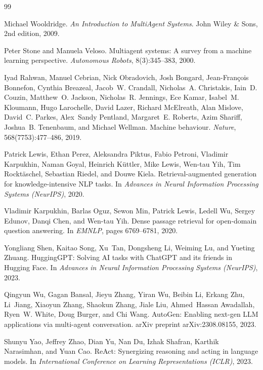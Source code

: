 \documentclass{article}
\begin{document}
\begin{thebibliography}{99}

Michael Wooldridge.
\newblock \emph{An Introduction to MultiAgent Systems}.
\newblock John Wiley \& Sons, 2nd edition, 2009.

Peter Stone and Manuela Veloso.
\newblock Multiagent systems: A survey from a machine learning perspective.
\newblock \emph{Autonomous Robots}, 8(3):345--383, 2000.

Iyad Rahwan, Manuel Cebrian, Nick Obradovich, Josh Bongard, Jean{-}Fran{\c{c}}ois Bonnefon, Cynthia Breazeal, Jacob~W. Crandall, Nicholas~A. Christakis, Iain~D. Couzin, Matthew~O. Jackson, Nicholas~R. Jennings, Ece Kamar, Isabel~M. Kloumann, Hugo Larochelle, David Lazer, Richard McElreath, Alan Mislove, David~C. Parkes, Alex~Sandy Pentland, Margaret~E. Roberts, Azim Shariff, Joshua~B. Tenenbaum, and Michael Wellman.
\newblock Machine behaviour.
\newblock \emph{Nature}, 568(7753):477--486, 2019.

Patrick Lewis, Ethan Perez, Aleksandra Piktus, Fabio Petroni, Vladimir Karpukhin, Naman Goyal, Heinrich K{\"u}ttler, Mike Lewis, Wen{-}tau Yih, Tim Rockt{\"a}schel, Sebastian Riedel, and Douwe Kiela.
\newblock Retrieval{-}augmented generation for knowledge{-}intensive NLP tasks.
\newblock In \emph{Advances in Neural Information Processing Systems (NeurIPS)}, 2020.

Vladimir Karpukhin, Barlas Oguz, Sewon Min, Patrick Lewis, Ledell Wu, Sergey Edunov, Danqi Chen, and Wen{-}tau Yih.
\newblock Dense passage retrieval for open{-}domain question answering.
\newblock In \emph{EMNLP}, pages 6769--6781, 2020.

Yongliang Shen, Kaitao Song, Xu~Tan, Dongsheng Li, Weiming Lu, and Yueting Zhuang.
\newblock HuggingGPT: Solving AI tasks with ChatGPT and its friends in Hugging Face.
\newblock In \emph{Advances in Neural Information Processing Systems (NeurIPS)}, 2023.

Qingyun Wu, Gagan Bansal, Jieyu Zhang, Yiran Wu, Beibin Li, Erkang Zhu, Li~Jiang, Xiaoyun Zhang, Shaokun Zhang, Jiale Liu, Ahmed~Hassan Awadallah, Ryen~W. White, Doug Burger, and Chi Wang.
\newblock AutoGen: Enabling next{-}gen LLM applications via multi{-}agent conversation.
\newblock arXiv preprint arXiv:2308.08155, 2023.

Shunyu Yao, Jeffrey Zhao, Dian Yu, Nan Du, Izhak Shafran, Karthik Narasimhan, and Yuan Cao.
\newblock ReAct: Synergizing reasoning and acting in language models.
\newblock In \emph{International Conference on Learning Representations (ICLR)}, 2023.


\end{thebibliography}
\end{document}
